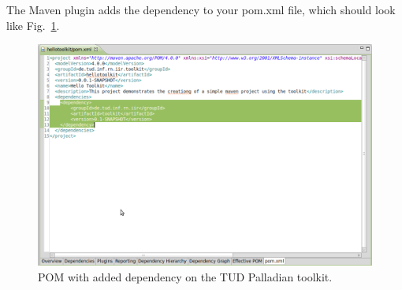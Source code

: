 \documentclass[a4paper,twoside]{book}      %
\begin{document}
The Maven plugin adds the dependency to your pom.xml file, which should look like Fig.~\ref{fig:pom01}.
\begin{figure}
\centering
\includegraphics[width=\textwidth]{img/ht06.png}
\caption{POM with added dependency on the TUD Palladian toolkit.}
\label{fig:pom01}
\end{figure}
\end{document}
